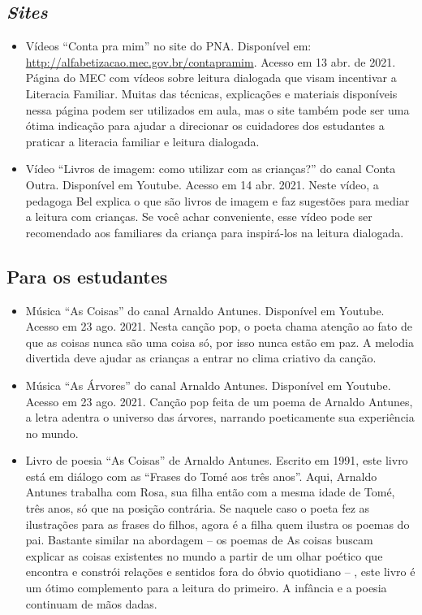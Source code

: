 \documentclass[11pt]{extarticle}
\begin{document}
\subsection{\textit{Sites}}

\begin{itemize}
\item Vídeos “Conta pra mim” no site do PNA. Disponível em: \url{http://alfabetizacao.mec.gov.br/contapramim}. 
Acesso em 13 abr. de 2021.
Página do MEC com vídeos sobre leitura dialogada que visam incentivar a Literacia Familiar. Muitas das 
técnicas, explicações e materiais disponíveis nessa página podem ser utilizados em aula, mas o site também 
pode ser uma ótima indicação para ajudar a direcionar os cuidadores dos estudantes a praticar 
a literacia familiar e leitura dialogada.

\item Vídeo “Livros de imagem: como utilizar com as crianças?” do canal Conta Outra. Disponível em Youtube. 
Acesso em 14 abr. 2021. 
Neste vídeo, a pedagoga Bel explica o que são livros de imagem e faz sugestões para mediar a leitura com 
crianças. Se você achar conveniente, esse vídeo pode ser recomendado aos familiares da criança 
para inspirá-los na leitura dialogada. 

\end{itemize}

\subsection{Para os estudantes}
\begin{itemize}
\item Música ``As Coisas'' do canal Arnaldo Antunes. Disponível em Youtube. Acesso em 23 ago. 2021. 
Nesta canção pop, o poeta chama atenção ao fato de que as coisas nunca são uma coisa só,
por isso nunca estão em paz. A melodia divertida deve ajudar as crianças a entrar no clima
criativo da canção. 

\item Música ``As Árvores'' do canal Arnaldo Antunes. Disponível em Youtube. Acesso em 23 ago. 2021.
Canção pop feita de um poema de Arnaldo Antunes, a letra adentra o universo das árvores, 
narrando poeticamente sua experiência no mundo. 

\item Livro de poesia ``As Coisas'' de Arnaldo Antunes. Escrito em 1991, este livro está em 
diálogo com as “Frases do Tomé aos três anos”. Aqui, Arnaldo Antunes trabalha com Rosa, sua 
filha então com a mesma idade de Tomé, três anos, só que na posição contrária. Se naquele 
caso o poeta fez as ilustrações para as frases do filhos, agora é a filha quem ilustra os 
poemas do pai. Bastante similar na abordagem – os poemas de As coisas buscam explicar as 
coisas existentes no mundo a partir de um olhar poético que encontra e constrói relações 
e sentidos fora do óbvio quotidiano – , este livro é um ótimo complemento para a leitura 
do primeiro. A infância e a poesia continuam de mãos dadas. 

\end{itemize}
\end{document}
